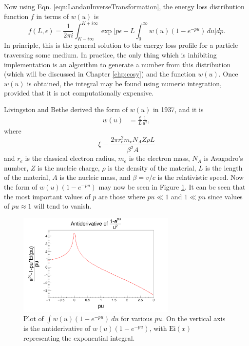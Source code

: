 Now using Eqn. \ref{eqn:LandauInverseTransformation}, the energy loss distribution function $f$ in terms of $w(u)$ is 
\begin{equation} \label{eqn:LandauGeneralSolution}
f(L,\epsilon)=\frac{1}{2\pi i} \int_{K-i\infty} ^{K+i\infty} \exp\Big[p\epsilon-L\int_0 ^\infty w(u)  (1-e^{-pu})\, du\Big] dp.
\end{equation}
In principle, this is the general solution to the energy loss profile for a particle traversing some medium. In practice, the only thing which is inhibiting implementation is an algorithm to generate a number from this distribution (which will be discussed in Chapter \ref{chp:cosy}) and the function $w(u)$. Once $w(u)$ is obtained, the integral may be found using numeric integration, provided that it is not computationally expensive.

Livingston and Bethe \cite{livingston} derived the form of $w(u)$ in 1937, and it is
\begin{align*}
w(u)&=\frac{\xi}{L}\frac{1}{u^2},
\end{align*}
where
\begin{equation}\label{eqn:xi}
\xi=\frac{2\pi r_e ^2 m_e N_A Z\rho L}{\beta^2 A}
\end{equation}
and $r_e$ is the classical electron radius, $m_e$ is the electron mass, $N_A$ is Avagadro's number, $Z$ is the nucleic charge, $\rho$ is the density of the material, $L$ is the length of the material, $A$ is the nucleic mass, and $\beta=v/c$ is the relativistic speed. Now the form of $w(u)(1-e^{-pu})$ may now be seen in Figure \ref{fig:landauPUPlot}. It can be seen that the most important values of $p$ are those where $pu \ll 1$ and $1 \ll pu$ since values of $pu\approx 1$ will tend to vanish.

\begin{figure}[h!]
  \centering
    \includegraphics[width=0.7\textwidth]{Figures/landauPUPlot} 
  \caption[Plot of $\int w(u)(1-e^{-pu})\ du$.]{Plot of $\int w(u)(1-e^{-pu})\ du$ for various $pu$. On the vertical axis is the antiderivative of $w(u)(1-e^{-pu})$, with $\text{Ei}(x)$ representing the exponential integral.}
  \label{fig:landauPUPlot}
\end{figure}

